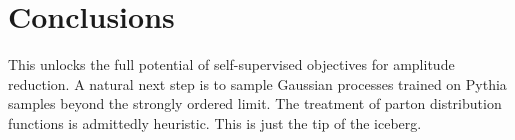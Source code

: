 \section{Conclusions}\label{sec:conclusions}

This unlocks the full potential of self-supervised objectives for
amplitude reduction. A natural next step is to sample Gaussian processes
trained on Pythia samples beyond the strongly ordered limit. The
treatment of parton distribution functions is admittedly heuristic. This
is just the tip of the iceberg.

